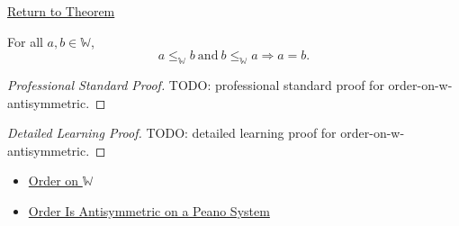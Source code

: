 \newpage
{}
\label{prf:order-on-w-antisymmetric}

\begin{remark*}[Return]
\hyperref[thm:order-on-w-antisymmetric]{Return to Theorem}
\end{remark*}

\begin{theorem*}
For all $a,b\in\mathbb{W}$,
\[
a\leq_{\mathbb{W}}b\ \text{and}\ b\leq_{\mathbb{W}}a
\Longrightarrow a=b.
\]
\end{theorem*}

\begin{proof}[Professional Standard Proof]
\LRAProofBodyStart
TODO: professional standard proof for order-on-w-antisymmetric.
\end{proof}

\begin{proof}[Detailed Learning Proof]
\LRAProofBodyStart
TODO: detailed learning proof for order-on-w-antisymmetric.
\end{proof}

\begin{remark*}
\end{remark*}

\begin{dependencies}
\begin{itemize}
  \item \hyperref[def:order-on-w]{Order on $\mathbb{W}$}
  \item \hyperref[thm:order-antisymmetric-on-peano-system]{Order Is Antisymmetric on a Peano System}
\end{itemize}
\end{dependencies}

\clearpage
